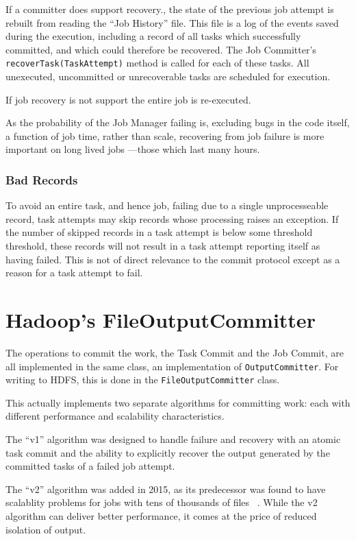 \documentclass[format=acmsmall, screen=true, review=false]{acmart}
\begin{document}
If a committer does support recovery.,
the state of the previous job attempt is rebuilt from reading the
``Job History'' file.
This file is a log of the events saved during the execution, including
a record of all tasks which successfully committed, and which could
therefore be recovered.
The Job Committer's \texttt{recoverTask(TaskAttempt)} method is called
for each of these tasks.
All unexecuted, uncommitted or unrecoverable tasks are scheduled for execution.

If job recovery is not support the entire job is re-executed.

As the probability of the Job Manager failing is, excluding bugs in the code itself,
a function of job time, rather than scale, recovering from job failure is more
important on long lived jobs ---those which last many hours.

\subsubsection{Bad Records}

To avoid an entire task, and hence job, failing due to a single unprocesseable record,
task attempts may skip records whose processing raises an exception.
If the number of skipped records in a task attempt is below some threshold
threshold, these records will not result in a task attempt reporting itself as
having failed.
This is not of direct relevance to the commit protocol except as a
reason for a task attempt to fail.

\section{Hadoop's FileOutputCommitter}
\label{sec:fileoutputcommitter}


The operations to commit the work, the Task Commit and the Job Commit,
are all implemented in the same class, an implementation of \texttt{OutputCommitter}.
For writing to HDFS, this is done in the \texttt{FileOutputCommitter} class.

This actually implements two separate algorithms for committing work: each
with different performance and scalability characteristics.

The ``v1'' algorithm was designed to handle failure and recovery with an
atomic task commit and the ability to explicitly recover the output generated
by the committed tasks of a failed job attempt.

The ``v2'' algorithm was added in 2015, as its predecessor was found
to have scalablity problems for jobs with tens of thousands of files
\ \cite{MAPREDUCE-4815}.
While the v2 algorithm can deliver better performance, it comes at the price of
reduced isolation of output.
\end{document}
